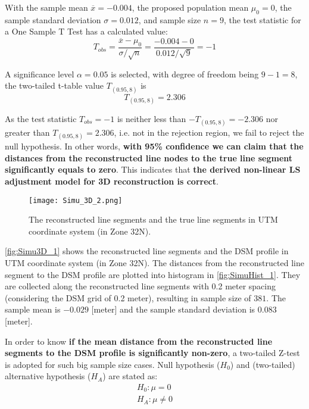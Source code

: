 With the sample mean $\overline{x}=-0.004$,
the proposed population mean $\mu_0=0$,
the sample standard deviation $\sigma=0.012$,
and sample size $n=9$, the test statistic for a One Sample T Test has a calculated value:
\begin{equation*}
T_{obs} = \frac{\overline{x}-\mu_0}{\sigma/\sqrt{n}}=\frac{-0.004-0}{0.012/\sqrt{9}}=-1
\end{equation*}

A significance level $\alpha=0.05$ is selected, with degree of freedom being $9-1=8$, the two-tailed t-table value $T_{(0.95,8)}$ is
\begin{equation*}
T_{(0.95,8)}=2.306
\end{equation*}

As the test statistic $T_{obs}=-1$ is neither less than $-T_{(0.95,8)}=-2.306$ nor greater than $T_{(0.95,8)}=2.306$, i.e. not in the rejection region, we fail to reject the null hypothesis. In other words, \textbf{with 95\% confidence we can claim that the distances from the reconstructed line nodes to the true line segment significantly equals to zero}. This indicates that \textbf{the derived non-linear LS adjustment model for 3D reconstruction is correct}.


\begin{figure}
  \centering
  \texttt{[image: Simu\_3D\_2.png]} %
  \caption{\small The reconstructed line segments and the true line segments in UTM coordinate system (in Zone 32N).}
  \label{fig:Simu3D_2}
\end{figure}

\clearpage

\cref{fig:Simu3D_1} shows the reconstructed line segments and the DSM profile in UTM coordinate system (in Zone 32N). The distances from the reconstructed line segment to the DSM profile are plotted into histogram in \cref{fig:SimuHist_1}. They are collected along the reconstructed line segments with 0.2 meter spacing (considering the DSM grid of 0.2 meter), resulting in sample size of $381$. The sample mean is $-0.029$ [meter] and the sample standard deviation is $0.083$ [meter]. %

In order to know \textbf{if the mean distance from the reconstructed line segments to the DSM profile is significantly non-zero}, a two-tailed Z-test is adopted for such big sample size cases. Null hypothesis ($H_0$) and (two-tailed) alternative hypothesis ($H_A$) are stated as:
\begin{equation*}
\begin{split}
H_0: \mu=0\\
H_A: \mu\neq0
\end{split}
\end{equation*}

